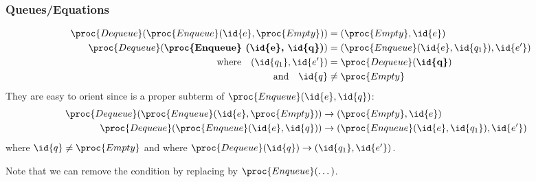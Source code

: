%
\begin{frame}
\frametitle{Queues/Equations}

\begin{align*}
\proc{Dequeue} (\proc{Enqueue} (\id{e}, \proc{Empty}))
&= (\proc{Empty}, \id{e})\\
\proc{Dequeue} (\textbf{\proc{Enqueue} (\id{e}, \id{q})})
&= (\proc{Enqueue} (\id{e}, \id{q_1}), \id{e'})\\
\text{where} \quad (\id{q_1}, \id{e'}) &= \proc{Dequeue}
  (\textbf{\id{q}})\\
\text{and} \quad \id{q} & \neq \proc{Empty}
\end{align*}
They are easy to orient since  is a proper subterm of
\(\proc{Enqueue} (\id{e}, \id{q})\):
\begin{align*}
  \proc{Dequeue} (\proc{Enqueue} (\id{e}, \proc{Empty}))
&\rightarrow (\proc{Empty}, \id{e}) & \\
  \proc{Dequeue} (\proc{Enqueue} (\id{e}, \id{q}))
&\rightarrow (\proc{Enqueue} (\id{e}, \id{q_1}), \id{e'})
\end{align*}
where \(\id{q} \neq \proc{Empty}\) and where
\(\proc{Dequeue} (\id{q}) \rightarrow (\id{q_1}, \id{e'})\).

Note that we can remove the condition by replacing  by
\(\proc{Enqueue} (\dots)\).

\end{frame}
